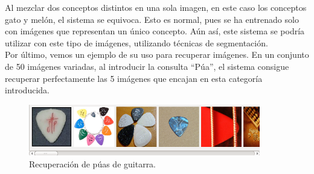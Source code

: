 Al mezclar dos conceptos distintos en una sola imagen, en este caso los conceptos gato y melón, el sistema se equivoca. Esto es normal, pues se ha entrenado solo con imágenes que representan un único concepto. Aún así, este sistema se podría utilizar con este tipo de imágenes, utilizando técnicas de segmentación.\\

Por último, vemos un ejemplo de su uso para recuperar imágenes. En un conjunto de 50 imágenes variadas, al introducir la consulta ``Púa'', el sistema consigue recuperar perfectamente las 5 imágenes que encajan en esta categoría introducida.\\

\begin{figure}[H]
\begin{center}

\includegraphics[width=0.9\textwidth]{img/Puas.png}
\end{center}

\caption{Recuperación de púas de guitarra.}
\end{figure}